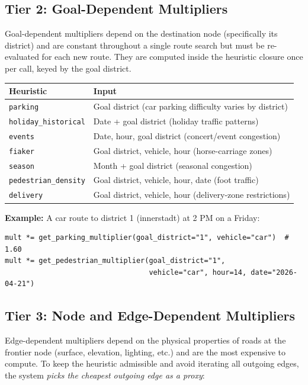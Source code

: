 \documentclass[12pt,a4paper]{article}
\begin{document}
\subsection{Tier 2: Goal-Dependent Multipliers}

Goal-dependent multipliers depend on the destination node (specifically its district) and are constant throughout a single route search but must be re-evaluated for each new route. They are computed inside the heuristic closure once per call, keyed by the goal district.

\begin{table}[H]
\centering
\begin{tabular}{ll}
\toprule
\textbf{Heuristic} & \textbf{Input} \\
\midrule
\texttt{parking} & Goal district (car parking difficulty varies by district) \\
\texttt{holiday\_historical} & Date + goal district (holiday traffic patterns) \\
\texttt{events} & Date, hour, goal district (concert/event congestion) \\
\texttt{fiaker} & Goal district, vehicle, hour (horse-carriage zones) \\
\texttt{season} & Month + goal district (seasonal congestion) \\
\texttt{pedestrian\_density} & Goal district, vehicle, hour, date (foot traffic) \\
\texttt{delivery} & Goal district, vehicle, hour (delivery-zone restrictions) \\
\bottomrule
\end{tabular}
\end{table}

\textbf{Example:} A car route to district 1 (innerstadt) at 2 PM on a Friday:
\begin{lstlisting}
mult *= get_parking_multiplier(goal_district="1", vehicle="car")  # 1.60
mult *= get_pedestrian_multiplier(goal_district="1",
                                  vehicle="car", hour=14, date="2026-04-21")
\end{lstlisting}

\subsection{Tier 3: Node and Edge-Dependent Multipliers}

Edge-dependent multipliers depend on the physical properties of roads at the frontier node (surface, elevation, lighting, etc.) and are the most expensive to compute. To keep the heuristic admissible and avoid iterating all outgoing edges, the system \textit{picks the cheapest outgoing edge as a proxy}:
\end{document}
